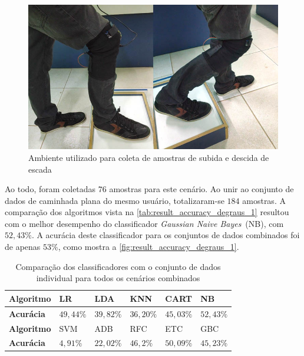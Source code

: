 \begin{figure}[ht]
	\caption{\label{fig:result_poses_degraus}Ambiente utilizado para coleta de amostras de subida e descida de escada}
	\begin{center}
		\includegraphics[width=.9\textwidth]{resources/result_poses_degraus}
	\end{center}
\end{figure}

Ao todo, foram coletadas \(76\) amostras para este cenário. Ao unir ao conjunto de dados de caminhada plana do mesmo usuário, totalizaram-se \(184\) amostras. A comparação dos algoritmos vista na \autoref{tab:result_accuracy_degraus_1} resultou com o melhor desempenho do classificador \textit{Gaussian Naive Bayes}~(NB), com \(52{,}43\%\). A acurácia deste classificador para os conjuntos de dados combinados foi de apenas \(53\%\), como mostra a \autoref{fig:result_accuracy_degraus_1}.


\begin{table}[ht]
	\caption{Comparação dos classificadores com o conjunto de dados individual para todos os cenários combinados}%
	\label{tab:result_accuracy_degraus_1}
	\begin{tabularx}{\textwidth}{X X X X X X}
		\toprule
		\textbf{Algoritmo} & LR            & LDA           & KNN           & CART          & NB            \\ \midrule
		\textbf{Acurácia}  & \(49{,}44\%\) & \(39{,}82\%\) & \(36{,}20\%\) & \(45{,}03\%\) & \(52{,}43\%\) \\ \bottomrule \toprule
		\textbf{Algoritmo} & SVM           & ADB           & RFC           & ETC           & GBC           \\ \midrule
		\textbf{Acurácia}  & \(4{,}91\%\)  & \(22{,}02\%\) & \(46{,}2\%\)  & \(50{,}09\%\) & \(45{,}23\%\) \\ \bottomrule
	\end{tabularx}
\end{table}


